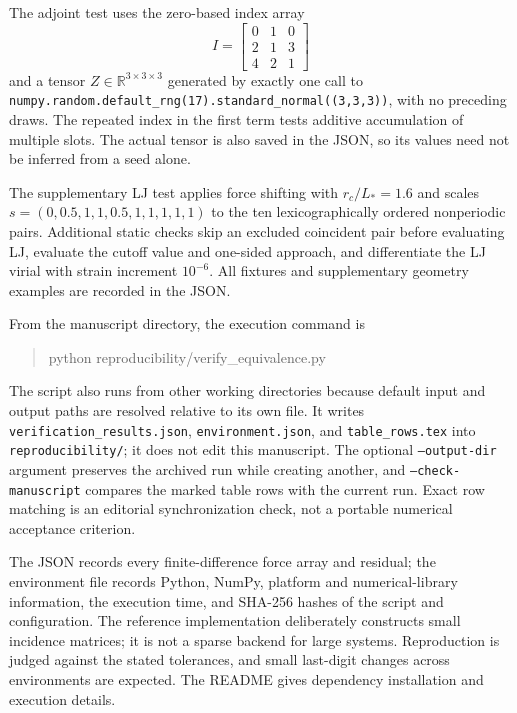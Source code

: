 \documentclass[11pt,a4paper]{article}
\newcommand{\RR}{\mathbb R}
\theoremstyle{definition}
\begin{document}
The adjoint test uses the zero-based index array
\begin{equation}
I=\begin{bmatrix}0&1&0\\2&1&3\\4&2&1\end{bmatrix}
\end{equation}
and a tensor $Z\in\RR^{3\times3\times3}$ generated by exactly one call to
\texttt{numpy.random.default\_rng(17).standard\_normal((3,3,3))}, with no preceding draws.
The repeated index in the first term tests additive accumulation of multiple slots. The
actual tensor is also saved in the JSON, so its values need not be inferred from a seed alone.

The supplementary LJ test applies force shifting with $r_c/L_*=1.6$ and scales
$s=(0,0.5,1,1,0.5,1,1,1,1,1)$ to the ten lexicographically ordered nonperiodic pairs.
Additional static checks skip an excluded coincident pair before evaluating LJ, evaluate
the cutoff value and one-sided approach, and differentiate the LJ virial with strain increment
$10^{-6}$. All fixtures and supplementary geometry examples are recorded in the JSON.

From the manuscript directory, the execution command is
\begin{quote}\ttfamily python reproducibility/verify\_equivalence.py\end{quote}
The script also runs from other working directories because default input and output paths
are resolved relative to its own file. It writes \texttt{verification\_results.json},
\texttt{environment.json}, and \texttt{table\_rows.tex} into \texttt{reproducibility/}; it
does not edit this manuscript. The optional \texttt{--output-dir} argument preserves the
archived run while creating another, and \texttt{--check-manuscript} compares the marked
table rows with the current run. Exact row matching is an editorial synchronization check,
not a portable numerical acceptance criterion.

The JSON records every finite-difference force array and residual; the environment file records
Python, NumPy, platform and numerical-library information, the execution time, and SHA-256
hashes of the script and configuration. The reference implementation deliberately constructs
small incidence matrices; it is not a sparse backend for large systems. Reproduction is
judged against the stated tolerances, and small last-digit changes across environments are
expected. The README gives dependency installation and execution details.
\end{document}

